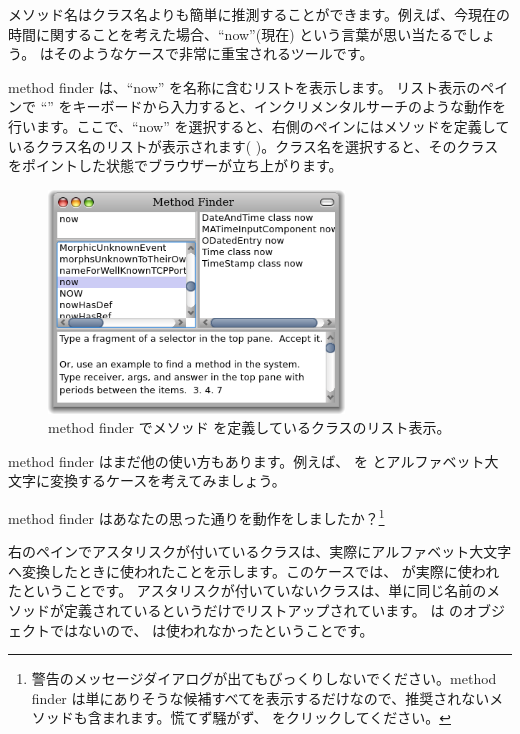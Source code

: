 \documentclass[a4paper,10pt,twoside]{book}
\begin{document}
メソッド名はクラス名よりも簡単に推測することができます。例えば、今現在の時間に関することを考えた場合、``now''(現在) という言葉が思い当たるでしょう。
 はそのようなケースで非常に重宝されるツールです。

method finder は、``now'' を名称に含むリストを表示します。
リスト表示のペインで ``'' をキーボードから入力すると、インクリメンタルサーチのような動作を行います。ここで、``now'' を選択すると、右側のペインにはメソッドを定義しているクラス名のリストが表示されます( )。クラス名を選択すると、そのクラスをポイントした状態でブラウザーが立ち上がります。

\begin{figure}[hbt]
\centerline {\includegraphics[width=0.7\textwidth]{methodFinder-now}}
\caption{method finder でメソッド  を定義しているクラスのリスト表示。
}
\end{figure}

method finder はまだ他の使い方もあります。例えば、 を  とアルファベット大文字に変換するケースを考えてみましょう。

\noindent
method finder はあなたの思った通りを動作をしましたか？\footnote{警告のメッセージダイアログが出てもびっくりしないでください。method finder は単にありそうな候補すべてを表示するだけなので、推奨されないメソッドも含まれます。慌てず騒がず、 をクリックしてください。}

右のペインでアスタリスクが付いているクラスは、実際にアルファベット大文字へ変換したときに使われたことを示します。このケースでは、 が実際に使われたということです。
アスタリスクが付いていないクラスは、単に同じ名前のメソッドが定義されているというだけでリストアップされています。 は  のオブジェクトではないので、 は使われなかったということです。
\end{document}
